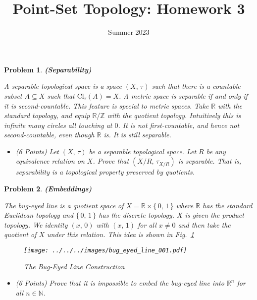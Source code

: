 \documentclass{article}
\title{Point-Set Topology: Homework 3}
\date{Summer 2023}
\theoremstyle{normal}
\newtheorem{problem}{Problem}
\begin{document}
    \maketitle
    \begin{problem}
        \textbf{(Separability)}
        \par\hfill\par
        A separable topological space is a space $(X,\,\tau)$ such that there
        is a countable subset $A\subseteq{X}$ such that
        $\textrm{Cl}_{\tau}(A)=X$.
        A metric space is separable if and only if it is second-countable. This
        feature is special to metric spaces. Take $\mathbb{R}$ with the
        standard topology, and equip $\mathbb{R}/\mathbb{Z}$ with the
        quotient topology. Intuitively this is infinite many circles all
        touching at $0$. It is not first-countable, and hence not
        second-countable, even though $\mathbb{R}$ is. It is still separable.
        \begin{itemize}
            \item (6 Points) Let $(X,\,\tau)$ be a separable topological space.
                Let $R$ be any equivalence relation on $X$. Prove that
                $(X/R,\,\tau_{X/R})$ is separable. That is, separability is
                a topological property preserved by quotients.
        \end{itemize}
    \end{problem}
    \maketitle
    \begin{problem}
        \textbf{(Embeddings)}
        \par\hfill\par
        The bug-eyed line is a quotient space of
        $X=\mathbb{R}\times\{\,0,\,1\,\}$ where $\mathbb{R}$ has the standard
        Euclidean topology and $\{\,0,\,1\,\}$ has the discrete topology. $X$
        is given the product topology. We identity
        $(x,\,0)$ with $(x,\,1)$ for all $x\ne{0}$ and then take the quotient
        of $X$ under this relation. This idea is shown in
        Fig.~\ref{fig:bug_eyed_line}
        \begin{figure}
            \centering
            \texttt{[image: ../../../images/bug\_eyed\_line\_001.pdf]}
            \caption{The Bug-Eyed Line Construction}
            \label{fig:bug_eyed_line}
        \end{figure}
        \begin{itemize}
            \item (6 Points) Prove that it is impossible to embed
            the bug-eyed line into $\mathbb{R}^{n}$ for all $n\in\mathbb{N}$.
        \end{itemize}
    \end{problem}
\end{document}
